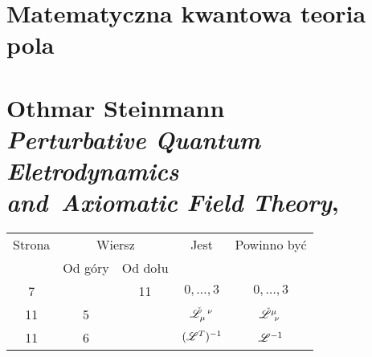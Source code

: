 \documentclass[a4paper,11pt]{article}
\numberwithin{equation}{section}
\begin{document}
\VerSpaceTwo


\noindent













\newpage

\section{Matematyczna kwantowa teoria pola}

\VerSpaceTwo



\section{  %
  Othmar Steinmann \\
  \textit{Perturbative Quantum Eletrodynamics} \\
  \textit{and~Axiomatic Field Theory},
  \cite{SteinmannPerturbativeQEDAndAxiomaticFieldTheory2000}}


\vspace{0em}



\vspace{0em}






\begin{center}

  \begin{tabular}{|c|c|c|c|c|}
    \hline
    Strona & \multicolumn{2}{c|}{Wiersz} & Jest
                              & Powinno być \\ \cline{2-3}
    & Od góry & Od dołu & & \\
    \hline
    7   & & 11 & $0,\ldots,\!3$ & $0, \ldots, 3$ \\
    11  &  5 & & $\tensor{ \check{ \Lcal } }{ _{ \mu }^{ \nu } }$
           & $\tensor{ \check{ \Lcal } }{ ^{ \mu }_{ \nu } }$ \\
    11  &  6 & & $( \mathcal{L}^{ T } )^{ -1 }$ & $\mathcal{L}^{ -1 }$ \\
    \hline
  \end{tabular}

\end{center}
\end{document}
